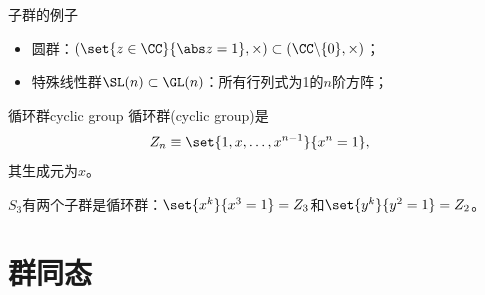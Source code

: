 \begin{example}{子群的例子}{}
	\begin{itemize}
		\item 圆群：$(\set{z\in\CC}{\abs z=1},\times)\subset(\CC\backslash\{0\},\times)$；
		\item 特殊线性群$\SL(n)\subset\GL(n)$：所有行列式为1的$n$阶方阵；
	\end{itemize}
\end{example}

\begin{definition}{循环群}{cyclic group}
	循环群(cyclic group)是
	\begin{equation}
		Z_n\equiv\set{1,x,\ldots,x^{n-1}}{x^n=1},
	\end{equation}
	其生成元为$x$。
\end{definition}
\begin{example}{}{}
	$S_3$有两个子群是循环群：$\set{x^k}{x^3=1}=Z_3$和$\set{y^k}{y^2=1}=Z_2$。
\end{example}

\section{群同态}

